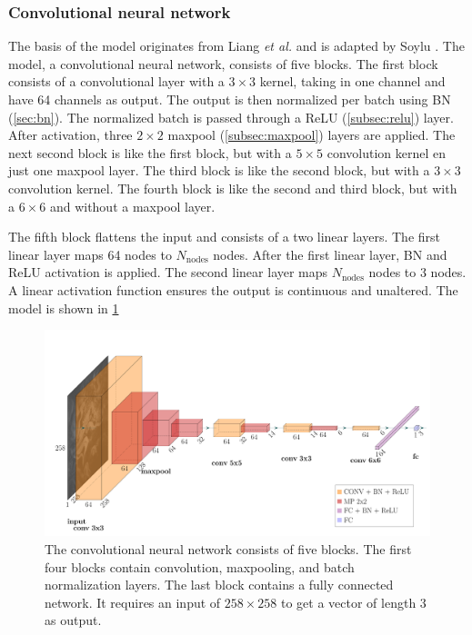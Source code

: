 \subsubsection{Convolutional neural network}
The basis of the model originates from Liang \emph{et al.} \cite{Liang2017} and is adapted by Soylu \cite{Soylu2022}.
The model, a convolutional neural network, consists of five blocks.
The first block consists of a convolutional layer with a $3\times3$ kernel, taking in one channel and have 64 channels as output.
The output is then normalized per batch using BN (\cref{sec:bn}).
The normalized batch is passed through a ReLU (\cref{subsec:relu}) layer.
After activation, three $2\times2$ maxpool (\cref{subsec:maxpool}) layers are applied.
The next second block is like the first block, but with a $5\times5$ convolution kernel en just one maxpool layer.
The third block is like the second block, but with a $3\times3$ convolution kernel.
The fourth block is like the second and third block, but with a $6\times6$ and without a maxpool layer.

The fifth block flattens the input and consists of a two linear layers.
The first linear layer maps 64 nodes to $N_\mathrm{nodes}$ nodes.
After the first linear layer, BN and ReLU activation is applied.
The second linear layer maps $N_\mathrm{nodes}$ nodes to 3 nodes.
A linear activation function ensures the output is continuous and unaltered.
The model is shown in \cref{fig:model}

\begin{figure}
    \includegraphics{skinstression/images/skinstression.pdf}
    \caption[Network architecture]{
        The convolutional neural network consists of five blocks.
        The first four blocks contain convolution, maxpooling, and batch normalization layers.
        The last block contains a fully connected network.
        It requires an input of $258\times258$ to get a vector of length 3 as output.
    }
    \label{fig:model}
\end{figure}

